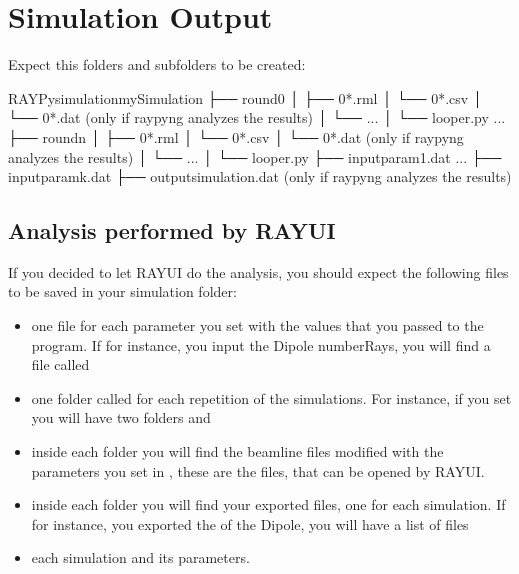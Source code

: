 \documentclass[letterpaper,10pt,english]{sphinxmanual}
\begin{document}
\section{Simulation Output}
\label{\detokenize{tutorial:simulation-output}}
\sphinxAtStartPar
Expect this folders and subfolders to be created:

\begin{sphinxVerbatim}[commandchars=\\\{\}]
RAYPy\PYGZus{}simulation\PYGZus{}mySimulation
├── round\PYGZus{}0
│   ├── 0\PYGZus{}*.rml
│   └── 0\PYGZus{}*.csv
│   └── 0\PYGZus{}*.dat (only if raypyng analyzes the results)
│   └── ...
│   └── looper.py
...
├── round\PYGZus{}n
│   ├── 0\PYGZus{}*.rml
│   └── 0\PYGZus{}*.csv
│   └── 0\PYGZus{}*.dat (only if raypyng analyzes the results)
│   └── ...
│   └── looper.py
├── input\PYGZus{}param\PYGZus{}1.dat
...
├── input\PYGZus{}param\PYGZus{}k.dat
├── output\PYGZus{}simulation.dat (only if raypyng analyzes the results)
\end{sphinxVerbatim}


\subsection{Analysis performed by RAY\sphinxhyphen{}UI}
\label{\detokenize{tutorial:analysis-performed-by-ray-ui}}
\sphinxAtStartPar
If you decided to let RAY\sphinxhyphen{}UI do the analysis, you should expect the following files to be
saved in your simulation folder:
\begin{itemize}
\item {} 
\sphinxAtStartPar
one file for each parameter you set with the values that you passed to the program.
If for instance, you input the Dipole numberRays, you will find a file called

\item {} 
\sphinxAtStartPar
one folder called  for each repetition of the simulations.
For instance, if you set  you will have two folders  and 

\item {} 
\sphinxAtStartPar
inside each  folder you will find the beamline files modified
with the parameters you set in , these are the  files,
that can be opened by RAY\sphinxhyphen{}UI.

\item {} 
\sphinxAtStartPar
inside each  folder you will find your exported files, one for
each simulation. If for instance, you exported the  of the Dipole,
you will have a list of files 

\item {} 
\sphinxAtStartPar
{} each simulation and its parameters.

\end{itemize}
\end{document}
